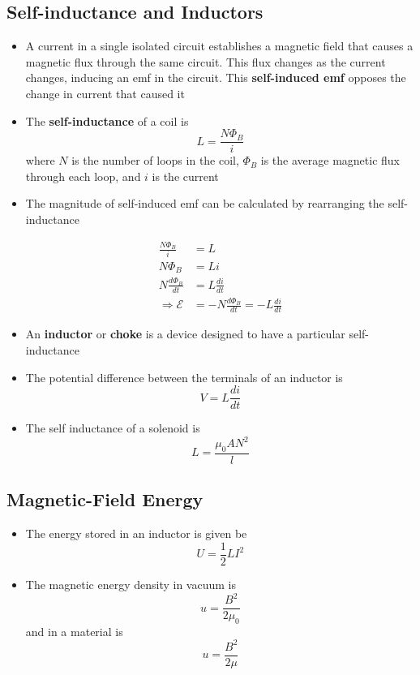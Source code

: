 \documentclass{article}
\begin{document}
\subsection{Self-inductance and Inductors}

\begin{itemize}
  \item A current in a single isolated circuit establishes a magnetic field that causes a magnetic flux through the same circuit. This flux changes as the current changes, inducing an emf in the circuit. This \textbf{self-induced emf} opposes the change in current that caused it

  \item The \textbf{self-inductance} of a coil is \[L = \frac{N \Phi_B}{i}\] where $N$ is the number of loops in the coil, $\Phi_B$ is the average magnetic flux through each loop, and $i$ is the current

  \item The magnitude of self-induced emf can be calculated by rearranging the self-inductance

        \begin{align*}
          \frac{N \Phi_B}{i}      & = L                                         \\
          N \Phi_B                & = L i                                       \\
          N \frac{d \Phi_B}{dt}   & = L \frac{di}{dt}                           \\
          \Rightarrow \mathcal{E} & = -N \frac{d \Phi_B}{dt} = -L \frac{di}{dt}
        \end{align*}

  \item An \textbf{inductor} or \textbf{choke} is a device designed to have a particular self-inductance

  \item The potential difference between the terminals of an inductor is \[V = L \frac{di}{dt}\]

\item The self inductance of a solenoid is \[L = \frac{\mu_0 A N^2}{l}\]
\end{itemize}

\subsection{Magnetic-Field Energy}

\begin{itemize}
  \item The energy stored in an inductor is given be \[U = \frac{1}{2} L I^2\]

  \item The magnetic energy density in vacuum is \[u = \frac{B^2}{2 \mu_0}\] and in a material is \[u = \frac{B^2}{2 \mu}\]
\end{itemize}
\end{document}
